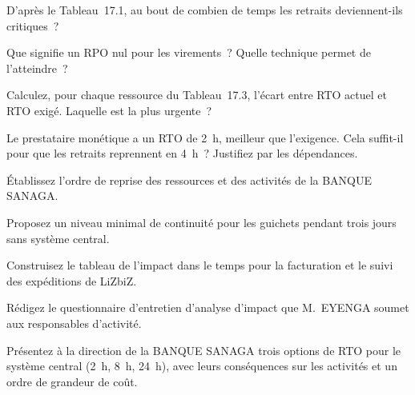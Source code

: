 \begin{boxexo}[title={\ding{45}\quad Exercice~17.2. Lire le tableau \niveaubase}]
D'après le Tableau~17.1, au bout de combien de temps les retraits
deviennent-ils critiques~?
\end{boxexo}

\begin{boxexo}[title={\ding{45}\quad Exercice~17.3. RPO nul \niveaubase}]
Que signifie un RPO nul pour les virements~? Quelle technique permet de
l'atteindre~?
\end{boxexo}

\begin{boxexo}[title={\ding{45}\quad Exercice~17.4. Écarts \niveaumoyen}]
Calculez, pour chaque ressource du Tableau~17.3, l'écart entre RTO actuel et
RTO exigé. Laquelle est la plus urgente~?
\end{boxexo}

\begin{boxexo}[title={\ding{45}\quad Exercice~17.5. Le prestataire monétique \niveaumoyen}]
Le prestataire monétique a un RTO de 2~h, meilleur que l'exigence. Cela
suffit-il pour que les retraits reprennent en 4~h~? Justifiez par les
dépendances.
\end{boxexo}

\begin{boxexo}[title={\ding{45}\quad Exercice~17.6. L'ordre \niveaumoyen}]
Établissez l'ordre de reprise des ressources et des activités de la BANQUE
SANAGA.
\end{boxexo}

\begin{boxexo}[title={\ding{45}\quad Exercice~17.7. Le niveau minimal \niveaumoyen}]
Proposez un niveau minimal de continuité pour les guichets pendant trois
jours sans système central.
\end{boxexo}

\begin{boxexo}[title={\ding{45}\quad Exercice~17.8. LiZbiZ \niveaumoyen}]
Construisez le tableau de l'impact dans le temps pour la facturation et le
suivi des expéditions de LiZbiZ.
\end{boxexo}

\begin{boxexo}[title={\ding{45}\quad Exercice~17.9. Le questionnaire \niveauexpert}]
Rédigez le questionnaire d'entretien d'analyse d'impact que M.~EYENGA
soumet aux responsables d'activité.
\end{boxexo}

\begin{boxexo}[title={\ding{45}\quad Exercice~17.10. Le coût des objectifs \niveauexpert}]
Présentez à la direction de la BANQUE SANAGA trois options de RTO pour le
système central (2~h, 8~h, 24~h), avec leurs conséquences sur les
activités et un ordre de grandeur de coût.
\end{boxexo}

